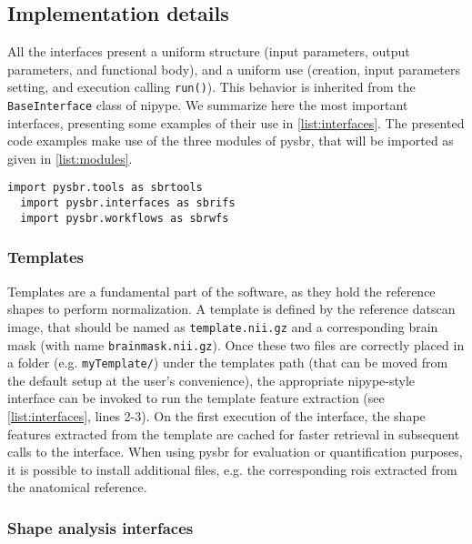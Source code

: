 \documentclass{frontiers}
\begin{document}
\subsection{Implementation details}
\label{sec:implementation_details}

All the interfaces present a uniform structure (input parameters, output parameters,
  and functional body), and a uniform use (creation, input parameters setting, and
  execution calling \texttt{run()}).
This behavior is inherited from the \texttt{BaseInterface} class of \gls*{nipype}.
We summarize here the most important interfaces,
  presenting some examples of their use in \autoref{list:interfaces}.
The presented code examples make use of the three modules of 
  \gls*{pysbr}, that will be imported as given in \autoref{list:modules}.
  
  \begin{lstlisting}[float,numbers=none,caption={\label{list:modules}
            Loading the three major elements of the python interface of PySBR}]
  import pysbr.tools as sbrtools
  import pysbr.interfaces as sbrifs
  import pysbr.workflows as sbrwfs
  \end{lstlisting}

\subsubsection{Templates}
\label{sec:templates}
Templates are a fundamental part of the software, as they hold the reference shapes to
  perform normalization.
A template is defined by the reference \gls*{datscan} image, that
  should be named as \texttt{template.nii.gz} and a corresponding brain mask (with name
  \texttt{brainmask.nii.gz}).
Once these two files are correctly placed in a folder
  (e.g. \texttt{myTemplate/}) under the templates path (that can be moved from the
  default setup at the user's convenience), the appropriate \gls*{nipype}-style
  interface can be invoked to run the template feature extraction (see
  \autoref{list:interfaces}, lines 2-3).
On the first execution of the interface, the shape features extracted from
  the template are cached for faster retrieval in subsequent calls to the interface. 
When using \gls*{pysbr} for evaluation or quantification purposes, it is possible
  to install additional files, e.g. the corresponding \glspl*{roi} extracted
  from the anatomical reference.


\subsubsection{Shape analysis interfaces}
\label{sec:shapeanalysis}
\end{document}
